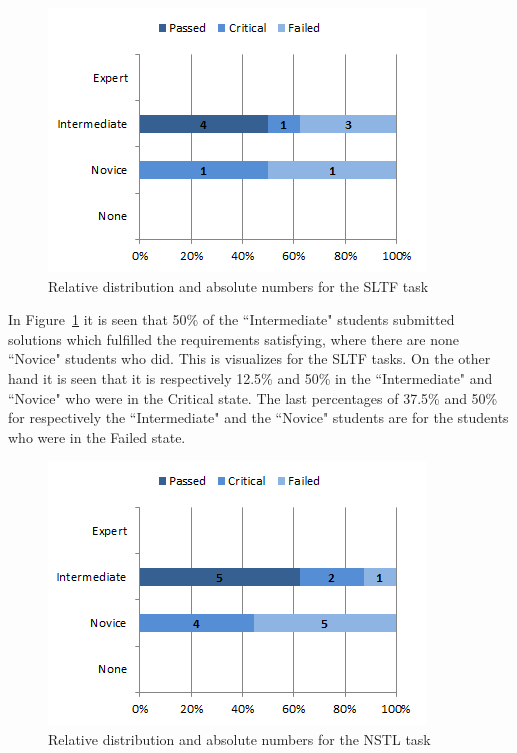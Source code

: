 \documentclass{sig-alternate-05-2015}
\begin{document}
\begin{figure}[!ht]
	\centering
	\includegraphics[width=1\linewidth]{img07}
	\caption{Relative distribution and absolute numbers for the SLTF task}
	\label{fig:SLTF percentage distributions with relative task numbers}
\end{figure}

In Figure~\ref{fig:SLTF percentage distributions with relative task numbers} it is seen that 50\% of the ``Intermediate" students submitted solutions which fulfilled the requirements satisfying, where there are none ``Novice" students who did. This is visualizes for the SLTF tasks. On the other hand it is seen that it is respectively 12.5\% and 50\% in the ``Intermediate" and ``Novice" who were in the Critical state. The last percentages of 37.5\% and 50\% for respectively the ``Intermediate" and the ``Novice" students are for the students who were in the Failed state.

\begin{figure}[!ht]
	\centering
	\includegraphics[width=1\linewidth]{img08}
	\caption{Relative distribution and absolute numbers for the NSTL task}
	\label{fig:NSTL percentage distributions with relative task numbers}
\end{figure}
\end{document}
